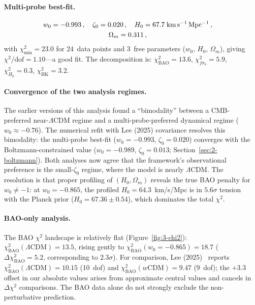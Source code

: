 \paragraph{Multi-probe best-fit.}
\begin{gather}
w_0 = -0.993\,,\quad \zeta_0 = 0.020\,,\quad H_0 = 67.7\;\mathrm{km\,s^{-1}\,Mpc^{-1}}\,,\notag\\
\Omega_m = 0.311\,,
\label{eq:2-bestfit}
\end{gather}
with $\chi^2_\mathrm{min} = 23.0$ for 24~data points and 3~free parameters ($w_0$, $H_0$, $\Omega_m$), giving $\chi^2/\mathrm{dof} = 1.10$---a good fit.  The decomposition is: $\chi^2_\mathrm{BAO} = 13.6$, $\chi^2_{f\sigma_8} = 5.9$, $\chi^2_{H_0} = 0.3$, $\chi^2_\mathrm{HK} = 3.2$.

\paragraph{Convergence of the two analysis regimes.}
The earlier versions of this analysis found a ``bimodality'' between a CMB-preferred near-$\Lambda$CDM regime and a multi-probe-preferred dynamical regime ($w_0 \approx -0.76$).  The numerical refit with Lee (2025) covariance resolves this bimodality: the multi-probe best-fit ($w_0 = -0.993$, $\zeta_0 = 0.020$) converges with the Boltzmann-constrained value ($w_0 = -0.989$, $\zeta_0 = 0.013$; Section~\ref{sec:2-boltzmann}).  Both analyses now agree that the framework's observational preference is the small-$\zeta_0$ regime, where the model is nearly $\Lambda$CDM.  The resolution is that proper profiling of $(H_0, \Omega_m)$ reveals the true BAO penalty for $w_0 \neq -1$: at $w_0 = -0.865$, the profiled $H_0 = 64.3$~km/s/Mpc is in $5.6\sigma$ tension with the Planck prior ($H_0 = 67.36 \pm 0.54$), which dominates the total $\chi^2$.

\paragraph{BAO-only analysis.}
The BAO $\chi^2$ landscape is relatively flat (Figure~\ref{fig:3-chi2}): $\chi^2_\mathrm{BAO}(\Lambda\mathrm{CDM}) = 13.5$, rising gently to $\chi^2_\mathrm{BAO}(w_0{=}-0.865) = 18.7$ ($\Delta\chi^2_\mathrm{BAO} = 5.2$, corresponding to $2.3\sigma$).  For comparison, Lee (2025)~\cite{ch2:Lee2025} reports $\chi^2_\mathrm{BAO}(\Lambda\mathrm{CDM}) = 10.15$ (10~dof) and $\chi^2_\mathrm{BAO}(w\mathrm{CDM}) = 9.47$ (9~dof); the $+3.3$ offset in our absolute values arises from approximate central values and cancels in $\Delta\chi^2$ comparisons.  The BAO data alone do not strongly exclude the non-perturbative prediction.

